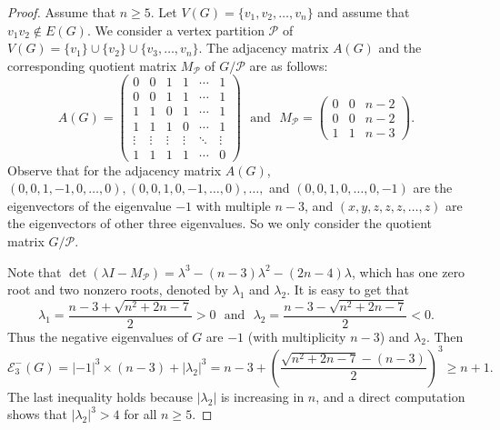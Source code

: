 \documentclass[10pt,a4paper]{amsart}
\begin{document}
\begin{proof}
Assume that $n\geq 5$. Let $V(G)=\{v_1, v_2, \ldots, v_n\}$ and assume that $v_1v_2\not\in E(G)$. We consider a vertex partition $\mathcal{P}$ of $V(G)=\{v_1\}\cup \{v_2\}\cup \{v_3, \ldots, v_n\}$. The adjacency matrix $A(G)$ and the corresponding quotient matrix $M_\mathcal{P}$ of $G/\mathcal{P}$ are as follows:
$$A(G)=
\begin{pmatrix}
0 & 0 & 1 & 1 & \cdots & 1 \\
0 & 0 & 1 & 1 & \cdots & 1 \\
1 & 1 & 0 & 1 & \cdots & 1 \\
1 & 1 & 1 & 0 & \cdots & 1 \\
\vdots & \vdots & \vdots & \vdots & \ddots & \vdots \\
1 & 1 & 1 & 1 & \cdots & 0
\end{pmatrix}
\text{~~and~~} M_\mathcal{P}=
\begin{pmatrix}
0 & 0 & n-2\\
0 & 0 & n-2\\
1 & 1 & n-3
\end{pmatrix}.$$
Observe that for the adjacency matrix $A(G)$, $(0,0,1,-1,0,\ldots,0), (0,0,1,0,-1,\ldots,0), \ldots,$ and $(0,0,1,0,\ldots,0,-1)$ are the eigenvectors of the eigenvalue $-1$ with multiple $n-3$, and $(x,y,z,z,z,\ldots,z)$ are the eigenvectors of other three eigenvalues. So we only consider the quotient matrix $G/\mathcal{P}$.

Note that $\det(\lambda I-M_\mathcal{P})=\lambda^3-(n-3)\lambda^2-(2n-4)\lambda$, which has one zero root and two nonzero roots, denoted by $\lambda_1$ and $\lambda_2$.
It is easy to get that 
$$\lambda_1=\frac{n-3+\sqrt{n^2+2n-7}}{2}>0 \text{~~and~~}
\lambda_2=\frac{n-3-\sqrt{n^2+2n-7}}{2}<0.$$
Thus the negative eigenvalues of $G$ are $-1$ (with multiplicity $n-3$) and $\lambda_2$. 
Then
$$\mathcal{E}_3^-(G)=|-1|^3\times (n-3)+|\lambda_2|^3=n-3+(\frac{\sqrt{n^2+2n-7}-(n-3)}{2})^3 \geq n+1.$$
The last inequality holds because $|\lambda_2|$ is increasing in $n$, and a direct computation shows that $|\lambda_2|^3 > 4$  for all $n \geq 5$.
\end{proof}
\end{document}
